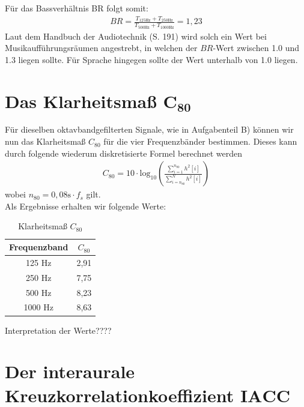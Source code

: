 Für das Bassverhältnis BR folgt somit:
\begin{align*}
BR = \frac{T_{125 \mathrm{Hz}} + T_{250 \mathrm{Hz}}}{T_{500 \mathrm{Hz}} + T_{1000 \mathrm{Hz}}} = 1,23
\end{align*}  
Laut dem Handbuch der Audiotechnik \cite{Weinzierl08} (S. 191) wird solch ein Wert bei Musikaufführungsräumen angestrebt, in welchen der $BR$-Wert zwischen 1.0 und 1.3 liegen sollte.
Für Sprache hingegen sollte der Wert unterhalb von 1.0 liegen.

\section{Das Klarheitsmaß $\mathbf{C_{80}}$}
\label{sec:c80}
Für dieselben oktavbandgefilterten Signale, wie in Aufgabenteil B) können wir nun das Klarheitsmaß $C_{80}$ für die vier Frequenzbänder bestimmen.
Dieses kann durch folgende wiederum diskretisierte Formel berechnet werden
\begin{align*}
C_{80} = 10\cdot \mathrm{log}_{10}\left(\frac{ \sum_{i=1}^{n_{80}} h^2[i]}{\sum_{i=n_{80}}^N h^2[i]}\right)
\end{align*}
wobei $n_{80} = 0,08 \mathrm{s} \cdot f_s$ gilt. \\
Als Ergebnisse erhalten wir folgende Werte:
\begin{table}[H]
\centering
\caption{Klarheitsmaß $C_{80}$}
\label{tab:C80}
\begin{tabular}{| c | c |}
\hline
  Frequenzband & $C_{80}$ \\
  \hline
  125 Hz & 2,91 \\
  250 Hz & 7,75 \\
  500 Hz & 8,23 \\
  1000 Hz & 8,63  \\
  \hline
  \end{tabular}
\end{table}

Interpretation der Werte????

\section{Der interaurale Kreuzkorrelationkoeffizient $\mathbf{IACC}$}
\label{sec:iacc}

